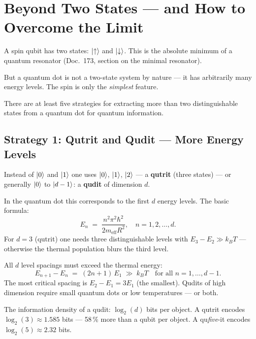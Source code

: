 \section{Beyond Two States --- and How to Overcome the Limit}
\label{sec:beyond-spin}

A spin qubit has two states: $\left|\uparrow\right\rangle$ and $\left|\downarrow\right\rangle$.
This is the absolute minimum of a quantum resonator
(Doc.~173, section on the minimal resonator).

But a quantum dot is not a two-state system by nature ---
it has arbitrarily many energy levels.
The spin is only the \textit{simplest} feature.

There are at least five strategies for extracting more than
two distinguishable states from a quantum dot
for quantum information.

\subsection{Strategy 1: Qutrit and Qudit --- More Energy Levels}
\label{sec:qudit}

Instead of $\left|0\right\rangle$ and $\left|1\right\rangle$ one uses $\left|0\right\rangle$, $\left|1\right\rangle$, $\left|2\right\rangle$
--- a \textbf{qutrit} (three states) ---
or generally $\left|0\right\rangle$ to $\left|d-1\right\rangle$:
a \textbf{qudit} of dimension $d$.

In the quantum dot this corresponds to the first $d$ energy levels.
The basic formula:
\begin{equation}
  E_n \;=\; \frac{n^2 \pi^2 \hbar^2}{2m_\text{eff} R^2},
  \quad n = 1, 2, \ldots, d.
\end{equation}
For $d = 3$ (qutrit) one needs three distinguishable levels
with $E_3 - E_2 \gg k_BT$ --- otherwise the thermal
population blurs the third level.

\begin{important}
All $d$ level spacings must exceed the thermal energy:
\[
  E_{n+1} - E_n \;=\; (2n+1)\,E_1 \;\gg\; k_BT
  \quad \text{for all } n = 1,\ldots,d-1.
\]
The most critical spacing is $E_2 - E_1 = 3E_1$ (the smallest).
Qudits of high dimension require small quantum dots
or low temperatures --- or both.
\end{important}

The information density of a qudit:
$\log_2(d)$ bits per object.
A qutrit encodes $\log_2(3) \approx 1.585$ bits ---
58\,\% more than a qubit per object.
A qu\textit{five}-it encodes $\log_2(5) \approx 2.32$ bits.

